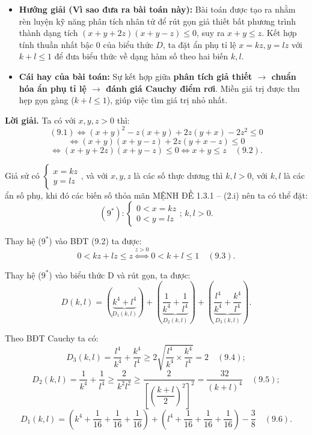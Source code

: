 \documentclass[12pt]{report}
\begin{document}
\begin{itemize}
    \item[\textbf{1.}] \textbf{Hướng giải (Vì sao đưa ra bài toán này):} 
    Bài toán được tạo ra nhằm rèn luyện kỹ năng phân tích nhân tử để rút gọn giả thiết bất phương trình thành dạng tích $(x+y+2z)(x+y-z) \le 0$, suy ra $x+y \le z$. Kết hợp tính thuần nhất bậc 0 của biểu thức $D$, ta đặt ẩn phụ tỉ lệ $x = kz, y = lz$ với $k+l \le 1$ để đưa biểu thức về dạng hàm số theo hai biến $k, l$.

    \item[\textbf{2.}] \textbf{Cái hay của bài toán:} 
    Sự kết hợp giữa \textbf{phân tích giả thiết $\rightarrow$ chuẩn hóa ẩn phụ tỉ lệ $\rightarrow$ đánh giá Cauchy điểm rơi}. Miền giá trị được thu hẹp gọn gàng ($k+l \le 1$), giúp việc tìm giá trị nhỏ nhất.
\end{itemize}
\vspace{0.2cm}
\noindent \textbf{Lời giải.} Ta có với $x, y, z > 0$ thì:
\[
(9.1) \Leftrightarrow (x + y)^2 - z(x + y) + 2z(y + x) - 2z^2 \leq 0
\]
\[
\Leftrightarrow (x + y)(x + y - z) + 2z(y + x - z) \leq 0
\]
\[
\Leftrightarrow (x + y + 2z)(x + y - z) \leq 0 \Leftrightarrow x + y \leq z \quad (9.2).
\]

\vspace{0.2cm}
\noindent Giả sử có $\begin{cases} x = kz \\ y = lz \end{cases}$, và với $x, y, z$ là các số thực dương thì $k, l > 0$, với $k, l$ là các ẩn số phụ, khi đó các biến số thỏa mãn MỆNH ĐỀ 1.3.1 -- (2.i) nên ta có thể đặt:
\[
(9^*): \begin{cases} 0 < x = kz \\ 0 < y = lz \end{cases}; \, k, l > 0.
\]

\noindent Thay hệ ($9^*$) vào BĐT (9.2) ta được:
\[
0 < kz + lz \leq z \overset{z > 0}{\Leftrightarrow} 0 < k + l \leq 1 \quad (9.3).
\]

\noindent Thay hệ ($9^*$) vào biểu thức D và rút gọn, ta được:
\[
D(k, l) = \left( \underbrace{k^4 + l^4}_{D_1(k, l)} \right) + \left( \underbrace{\dfrac{1}{k^4} + \dfrac{1}{l^4}}_{D_2(k, l)} \right) + \left( \underbrace{\dfrac{l^4}{k^4} + \dfrac{k^4}{l^4}}_{D_3(k, l)} \right).
\]

\vspace{0.2cm}
\noindent Theo BĐT Cauchy ta có:
\[
D_3(k, l) = \dfrac{l^4}{k^4} + \dfrac{k^4}{l^4} \geq 2\sqrt{\dfrac{l^4}{k^4} \times \dfrac{k^4}{l^4}} = 2 \quad (9.4);
\]
\[
D_2(k, l) = \dfrac{1}{k^4} + \dfrac{1}{l^4} \geq \dfrac{2}{k^2l^2} \geq \dfrac{2}{\left[ \left(\dfrac{k + l}{2}\right)^2 \right]^2} = \dfrac{32}{(k + l)^4} \quad (9.5);
\]
\[
D_1(k, l) = \left( k^4 + \dfrac{1}{16} + \dfrac{1}{16} + \dfrac{1}{16} \right) + \left( l^4 + \dfrac{1}{16} + \dfrac{1}{16} + \dfrac{1}{16} \right) - \dfrac{3}{8} \quad (9.6).
\]
\end{document}
